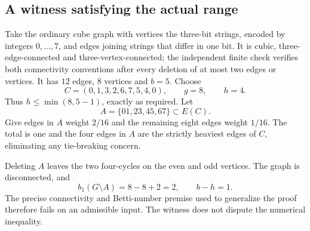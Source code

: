 \documentclass[10pt]{article}
\begin{document}
\subsection*{A witness satisfying the actual range}
Take the ordinary cube graph with vertices the three-bit strings, encoded by integers \(0,\ldots,7\), and edges joining strings that differ in one bit. It is cubic, three-edge-connected and three-vertex-connected; the independent finite check verifies both connectivity conventions after every deletion of at most two edges or vertices. It has \(12\) edges, \(8\) vertices and \(b=5\). Choose \[C=(0,1,3,2,6,7,5,4,0),\qquad g=8,\qquad h=4.\] Thus \(h\leq\min(8,5-1)\), exactly as required. Let \[A=\{01,23,45,67\}\subset E(C).\] Give edges in \(A\) weight \(2/16\) and the remaining eight edges weight \(1/16\). The total is one and the four edges in \(A\) are the strictly heaviest edges of \(C\), eliminating any tie-breaking concern.\par
Deleting \(A\) leaves the two four-cycles on the even and odd vertices. The graph is disconnected, and \[b_1(G\setminus A)=8-8+2=2,\qquad b-h=1.\] The precise connectivity and Betti-number premise used to generalize the proof therefore fails on an admissible input. The witness does not dispute the numerical inequality.\par
\end{document}
